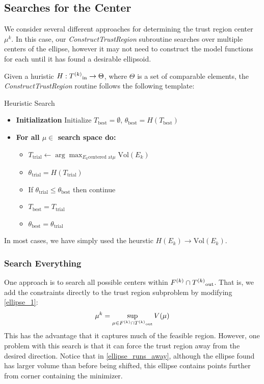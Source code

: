 \subsection{Searches for the Center}

We consider several different approaches for determining the trust region center $\mu^k$.
In this case, our \emph{ConstructTrustRegion} subroutine searches over multiple centers of the ellipse, however it may not need to construct the model functions for each until it has found a desirable ellipsoid.

Given a huristic $H : {T^{(k)}}_{\text{in}} \to \Theta$, where $\Theta$ is a set of comparable elements, the \emph{ConstructTrustRegion} routine follows the following template:

\begin{algorithm}[H]
    \caption{Heuristic Search}
    \label{heuristic_search}
    \begin{itemize}
        \item[] \textbf{Initialization} Initialize $T_{\text{best}} = \emptyset$, $\theta_{\text{best}} = H(T_{\text{best}})$
            
        \item[] \textbf{For all $\mu \in$ search space do:} \begin{itemize}
                \item[] $T_{\text{trial}} \gets \arg\max_{E_k \text{centered at} \mu} \text{Vol}(E_k)$
                \item[] $\theta_{\text{trial}} = H(T_{\text{trial}})$
                \item[] If $\theta_{\text{trial}} \le \theta_{\text{best}}$ then continue
                \item[] $T_{\text{best}} = T_{\text{trial}}$
                \item[] $\theta_{\text{best}} = \theta_{\text{trial}}$
            \end{itemize}
    \end{itemize}
\end{algorithm}

In most cases, we have simply used the heurstic $H(E_k) \to \text{Vol}(E_k)$.

\subsubsection{Search Everything}

One approach is to search all possible centers within $ {F}^{(k)} \cap {T^{(k)}}_{\text{out}} $.
That is, we add the constraints directly to the trust region subproblem by modifying \cref{ellipse_1}:
$$\mu^k = \sup_{\mu \in {F}^{(k)} \cap {T^{(k)}}_{\text{out}}} V(\mu)$$
This has the advantage that it captures much of the feasible region.
However, one problem with this search is that it can force the trust region away from the desired direction.
Notice that in \cref{ellipse_runs_away}, although the ellipse found has larger volume than before being shifted, this ellipse contains points further from corner containing the minimizer.

